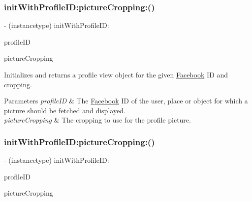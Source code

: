 \subsubsection{\texorpdfstring{init\+With\+Profile\+I\+D\+:picture\+Cropping\+:()}{initWithProfileID:pictureCropping:()}\hspace{0.1cm}{\footnotesize\ttfamily [3/5]}}
{\footnotesize\ttfamily -\/ (instancetype) init\+With\+Profile\+I\+D\+: \begin{DoxyParamCaption}\item[{(N\+S\+String $\ast$)}]{profile\+ID }\item[{pictureCropping:(F\+B\+Profile\+Picture\+Cropping)}]{picture\+Cropping }\end{DoxyParamCaption}}

Initializes and returns a profile view object for the given \hyperlink{interfaceFacebook}{Facebook} ID and cropping.


\begin{DoxyParams}{Parameters}
{\em profile\+ID} & The \hyperlink{interfaceFacebook}{Facebook} ID of the user, place or object for which a picture should be fetched and displayed. \\
\hline
{\em picture\+Cropping} & The cropping to use for the profile picture. \\
\hline
\end{DoxyParams}
\mbox{\label{interfaceFBProfilePictureView_ac31bbd3ec87c79d3b1ccd4f3466e46b1}} 
\subsubsection{\texorpdfstring{init\+With\+Profile\+I\+D\+:picture\+Cropping\+:()}{initWithProfileID:pictureCropping:()}\hspace{0.1cm}{\footnotesize\ttfamily [4/5]}}
{\footnotesize\ttfamily -\/ (instancetype) init\+With\+Profile\+I\+D\+: \begin{DoxyParamCaption}\item[{(N\+S\+String $\ast$)}]{profile\+ID }\item[{pictureCropping:(F\+B\+Profile\+Picture\+Cropping)}]{picture\+Cropping }\end{DoxyParamCaption}}

